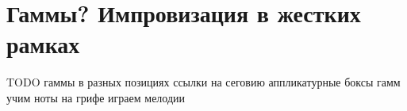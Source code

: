 \section{Гаммы? Импровизация в жестких рамках}
\label{ch:harmony:scales}

TODO
гаммы в разных позициях
ссылки на сеговию
аппликатурные боксы гамм
учим ноты на грифе
играем мелодии
